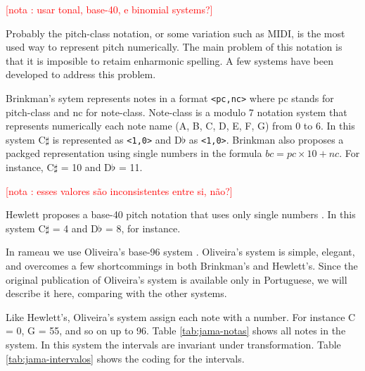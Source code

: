\documentclass{article}
\newcounter{notacounter}
\newcommand{\nota}[1]{
  \addtocounter{notacounter}{1}
  \textcolor{red}{[nota \arabic{notacounter}: #1]}
}
\begin{document}
\nota{usar tonal, base-40, e binomial systems?}

Probably the pitch-class notation, or some variation such as MIDI, is
the most used way to represent pitch numerically. The main problem of
this notation is that it is imposible to retaim enharmonic spelling. A
few systems have been developed to address this problem. 

Brinkman's sytem \cite{brinkman86:_binom_repres_of_pitch_for}
represents notes in a format \texttt{<pc,nc>} where pc stands for
pitch-class and nc for note-class. Note-class is a modulo 7 notation
system that represents numerically each note name (A, B, C, D, E, F,
G) from 0 to 6. In this system C$\sharp$ is represented as
\texttt{<1,0>} and D$\flat$ as \texttt{<1,0>}. Brinkman also proposes
a packged representation using single numbers in the formula $bc =
pc\times10 + nc$. For instance, C$\sharp$ = 10 and D$\flat$ =
11.\nota{esses valores são inconsistentes entre si, não?}

Hewlett proposes a base-40 pitch notation that uses only single
numbers \cite{hewlett92:base40}. In this system C$\sharp$ = 4 and
D$\flat$ = 8, for instance.

In rameau we use Oliveira's base-96 system
\cite{oliveira01:codificacao}. Oliveira's system is simple, elegant,
and overcomes a few shortcommings in both Brinkman's and Hewlett's.
Since the original publication of Oliveira's system is available only
in Portuguese, we will describe it here, comparing with the other
systems.

Like Hewlett's, Oliveira's system assign each note with a number. For
instance C = 0, G = 55, and so on up to 96. Table
\ref{tab:jama-notas} shows all notes in the system. In this system the
intervals are invariant under transformation. Table
\ref{tab:jama-intervalos} shows the coding for the intervals.
\end{document}
